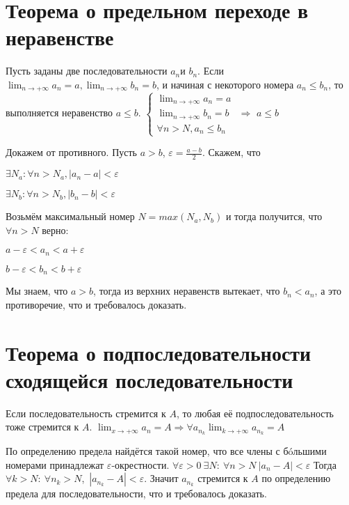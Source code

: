 \section[Т. о пред. перех. в нерав.]{Теорема о предельном переходе в неравенстве}
\begin{theorem}
Пусть заданы две последовательности ${a_n}$и ${b_n}$. Если $\displaystyle \lim_{n \to +\infty} a_n = 
a, \displaystyle \lim_{n \to +\infty} b_n = b$, и начиная с некоторого номера $a_n \leq b_n$, то 
выполняется неравенство $a \leq b$.  \newline
$\begin{cases}
\displaystyle \lim_{n \to +\infty} a_n = a \\ \displaystyle \lim_{n \to +\infty} b_n = b
\\ \forall n > N, a_n \leq b_n
\end{cases}$
$\Longrightarrow$ \qquad $\displaystyle a \leq b$
\end{theorem}
Докажем от противного. Пусть $a > b$, $\varepsilon = \frac{a - b}{2}$. Скажем, что
\begin{center}
$\exists N_a: \forall n > N_a, |a_n - a| < \varepsilon$
\end{center}
\begin{center}
$\exists N_b: \forall n > N_b, |b_n - b| < \varepsilon$
\end{center}
Возьмём максимальный номер $N = max(N_a, N_b)$ и тогда получится, что $\forall n > N$ верно:
\begin{center}
$a - \varepsilon < a_n < a + \varepsilon$
\end{center}
\begin{center}
$b - \varepsilon < b_n < b + \varepsilon$
\end{center}
Мы знаем, что $a > b$, тогда из верхних неравенств вытекает, что $b_n < a_n$, а это противоречие, 
что и требовалось доказать.



\section[Т. о п/посл. сход. послед.]{Теорема о подпоследовательности сходящейся последовательности}
\begin{theorem}
Если последовательность стремится к $A$, то любая её подпоследовательность тоже стремится к 
$A$.\newline
$\displaystyle \lim_{x \to +\infty} a_n = A \Rightarrow \forall a_{n_k} \lim_{k \to +\infty} a_{n_k} 
= A$
\end{theorem}
По определению предела найдётся такой номер, что все члены с б\'oльшими номерами принадлежат 
$\varepsilon$-окрестности.
$\forall \varepsilon > 0\ \exists N:\ \forall n > N\ |a_n - A| < \varepsilon$\newline
Тогда $\forall k > N:\ \forall n_k > N$,\  $|a_{n_k} - A| < \varepsilon$.\newline
Значит $a_{n_k}$ стремится к $A$ по определению предела для последовательности, что и требовалось 
доказать.  

